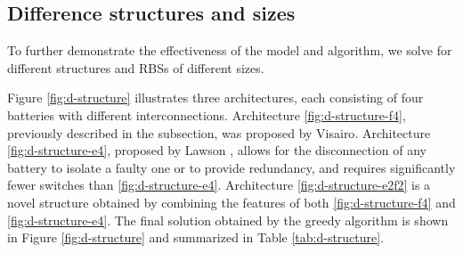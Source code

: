 \documentclass{article}
\begin{document}
\subsection{Difference structures and sizes}

To further demonstrate the effectiveness of the model and algorithm, we solve for different structures and RBSs of different sizes.


Figure \ref{fig:d-structure} illustrates three architectures, each consisting of four batteries with different interconnections.
Architecture \ref{fig:d-structure-f4}, previously described in the subsection, was proposed by Visairo\cite{visairoReconfigurableBatteryPack2008}. 
Architecture \ref{fig:d-structure-e4}, proposed by Lawson \cite{lawsonSoftwareConfigurableBattery2012}, allows for the disconnection of any battery to isolate a faulty one or to provide redundancy, and requires significantly fewer switches than \ref{fig:d-structure-e4}. 
Architecture \ref{fig:d-structure-e2f2} is a novel structure obtained by combining the features of both \ref{fig:d-structure-f4} and \ref{fig:d-structure-e4}. 
The final solution obtained by the greedy algorithm is shown in Figure \ref{fig:d-structure} and summarized in Table \ref{tab:d-structure}.
\end{document}
